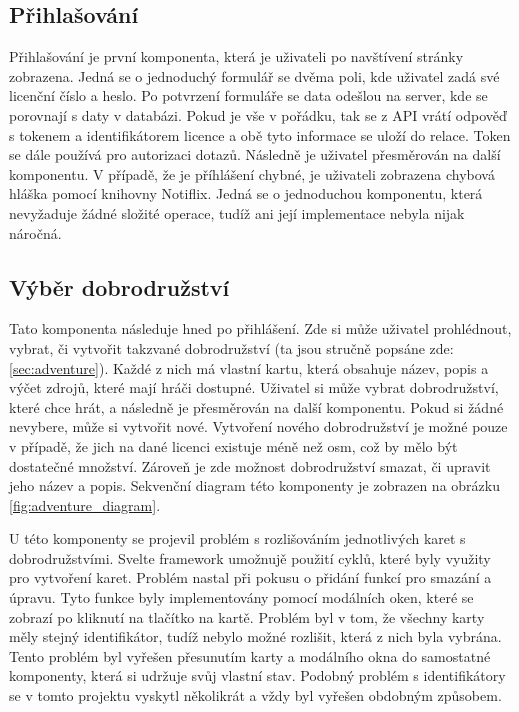 \subsection{Přihlašování}
Přihlašování je první komponenta, která je uživateli po navštívení stránky zobrazena. Jedná se o jednoduchý formulář se dvěma poli, kde uživatel zadá své licenční číslo a heslo. Po potvrzení formuláře se data odešlou na server, kde se porovnají s daty v databázi. Pokud je vše v pořádku, tak se z API vrátí odpověď s tokenem a identifikátorem licence a obě tyto informace se uloží do relace. Token se dále používá pro autorizaci dotazů. Následně je uživatel přesměrován na další komponentu. V případě, že je příhlášení chybné, je uživateli zobrazena chybová hláška pomocí knihovny Notiflix. Jedná se o jednoduchou komponentu, která nevyžaduje žádné složité operace, tudíž ani její implementace nebyla nijak náročná.

\subsection{Výběr dobrodružství}
Tato komponenta následuje hned po přihlášení. Zde si může uživatel prohlédnout, vybrat, či vytvořit takzvané dobrodružství (ta jsou stručně popsáne zde: \ref{sec:adventure}). Každé z nich má vlastní kartu, která obsahuje název, popis a výčet zdrojů, které mají hráči dostupné. Uživatel si může vybrat dobrodružství, které chce hrát, a následně je přesměrován na další komponentu. Pokud si žádné nevybere, může si vytvořit nové. Vytvoření nového dobrodružství je možné pouze v případě, že jich na dané licenci existuje méně než osm, což by mělo být dostatečné množství. Zároveň je zde možnost dobrodružství smazat, či upravit jeho název a popis. Sekvenční diagram této komponenty je zobrazen na obrázku \ref{fig:adventure_diagram}.

U této komponenty se projevil problém s rozlišováním jednotlivých karet s dobrodružstvími. Svelte framework umožnujě použití cyklů, které byly využity pro vytvoření karet. Problém nastal při pokusu o přidání funkcí pro smazání a úpravu. Tyto funkce byly implementovány pomocí modálních oken, které se zobrazí po kliknutí na tlačítko na kartě. Problém byl v tom, že všechny karty měly stejný identifikátor, tudíž nebylo možné rozlišit, která z nich byla vybrána. Tento problém byl vyřešen přesunutím karty a modálního okna do samostatné komponenty, která si udržuje svůj vlastní stav. Podobný problém s identifikátory se v tomto projektu vyskytl několikrát a vždy byl vyřešen obdobným způsobem.

